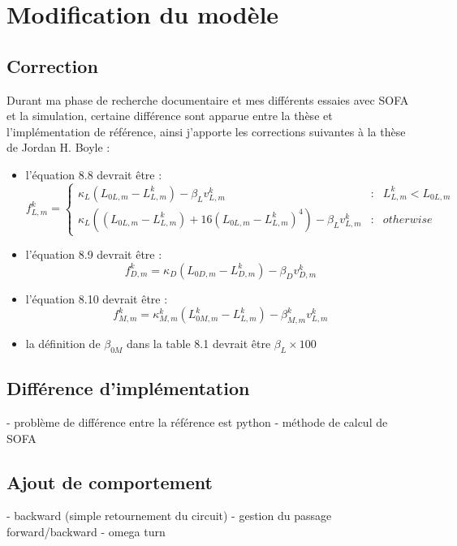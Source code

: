 \chapter{Modification du modèle} %
\label{cha:Modification du modèle}

\section{Correction} %
\label{sec:Correction}

Durant ma phase de recherche documentaire et mes différents essaies avec
SOFA et la simulation, certaine différence sont apparue entre la thèse
et l'implémentation de référence, ainsi j'apporte les corrections suivantes
à la thèse de Jordan H. Boyle \cite{Boyle2009} :
\begin{itemize}
   \item l'équation 8.8 devrait être :
      $$
      f^k_{L,m} = \left\{ 
         \begin{array}{rcl}
            \kappa_L(L_{0L,m} - L_{L,m}^k) - \beta_{L}v_{L,m}^k & : & L_{L,m}^k < L_{0L,m}\\
            \kappa_L((L_{0L,m} - L_{L,m}^k) + 16(L_{0L,m} - L_{L,m}^k)^4) - \beta_{L}v_{L,m}^k & : & otherwise
         \end{array}
         \right.
      $$
   \item l'équation 8.9 devrait être :
      $$
      f_{D,m}^k = \kappa_D(L_{0D,m} - L_{D,m}^k) - \beta_{D}v_{D,m}^k
      $$
   \item l'équation 8.10 devrait être :
      $$
      f_{M,m}^k = \kappa_{M,m}^k(L_{0M,m}^k - L_{L,m}^k) - \beta_{M,m}^{k}v_{L,m}^k
      $$
   \item la définition de $\beta_{0M}$ dans la table 8.1 devrait être $\beta_L \times 100$
\end{itemize}


\section{Différence d'implémentation} %
\label{sec:Différence d'implémentation}

- problème de différence entre la référence est python
- méthode de calcul de SOFA


\section{Ajout de comportement} %
\label{sec:Ajout de comportement}

- backward (simple retournement du circuit)
  - gestion du passage forward/backward
- omega turn



